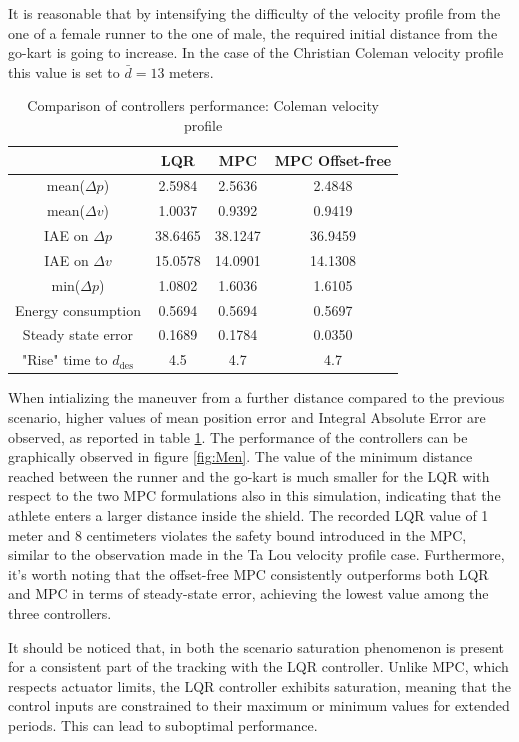 \documentclass[a4paper,12pt,oneside]{book}
\begin{document}
It is reasonable that by intensifying the difficulty of the velocity profile from the one of a female runner to the one of male, the required initial distance from the go-kart is going to increase.
In the case of the Christian Coleman velocity profile this value is set to $\bar{d} = 13$ meters.

\begin{table}[h!]
	\centering
	\begin{tabular}{c|c|c|c}
          & \textbf{LQR} & \textbf{MPC} & \textbf{MPC Offset-free} \\
	\hline
	\hline
	mean($\Delta p$) & 2.5984 & 2.5636 &  2.4848 \\
	mean($\Delta v$) & 1.0037 & 0.9392 & 0.9419 \\
	IAE on $\Delta p$ & 38.6465 & 38.1247 & 36.9459 \\
	IAE on $\Delta v$ & 15.0578 & 14.0901 & 14.1308 \\
	min($\Delta p$) & 1.0802 & 1.6036 & 1.6105 \\
	Energy consumption & 0.5694 & 0.5694 & 0.5697 \\
	Steady state error & 0.1689 & 0.1784 & 0.0350 \\
	"Rise" time to $d_\text{des}$ & 4.5 & 4.7 & 4.7 \\
	\hline
	\end{tabular}
\caption{Comparison of controllers performance: Coleman velocity profile}
\label{tab:Coleman}
\end{table}

When intializing the maneuver from a further distance compared to the previous scenario, higher values of mean position error and Integral Absolute Error are observed, as reported in table \ref{tab:Coleman}.
The performance of the controllers can be graphically observed in figure \ref{fig:Men}.
The value of the minimum distance reached between the runner and the go-kart is much smaller for the LQR with respect to the two MPC formulations also in this simulation, indicating that the athlete enters a larger distance inside the shield. 
The recorded LQR value of 1 meter and 8 centimeters violates the safety bound introduced in the MPC, similar to the observation made in the Ta Lou velocity profile case.
Furthermore, it's worth noting that the offset-free MPC consistently outperforms both LQR and MPC in terms of steady-state error, achieving the lowest value among the three controllers.

It should be noticed that, in both the scenario saturation phenomenon is present for a consistent part of the tracking with the LQR controller.
Unlike MPC, which respects actuator limits, the LQR controller exhibits saturation, meaning that the control inputs are constrained to their maximum or minimum values for extended periods. 
This can lead to suboptimal performance.
\end{document}
